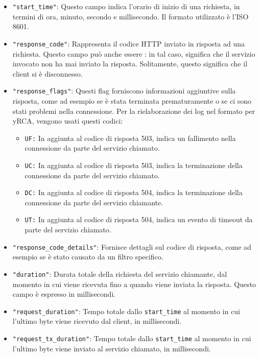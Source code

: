 \begin{itemize}
\item \texttt{"start\_time"}: Questo campo indica l'orario di inizio di una richiesta, in termini di ora, minuto, secondo e millisecondo. Il formato utilizzato è l'ISO 8601.

\item \texttt{"response\_code"}: Rappresenta il codice HTTP inviato in risposta ad una richiesta. Questo campo può anche essere : in tal caso, significa che il servizio invocato non ha mai inviato la risposta. Solitamente, questo significa che il client si è disconnesso.

\item \texttt{"response\_flags"}: Questi flag forniscono informazioni aggiuntive sulla risposta, come ad esempio se è stata terminata prematuramente o se ci sono stati problemi nella connessione. Per la rielaborazione dei log nel formato per yRCA, vengono usati questi codici:

\begin{itemize}
\item \texttt{UF:} In aggiunta al codice di risposta 503, indica un fallimento nella connessione da parte del servizio chiamato.
\item \texttt{UC:} In aggiunta al codice di risposta 503, indica la terminazione della connessione da parte del servizio chiamato.
\item \texttt{DC:} In aggiunta al codice di risposta 504, indica la terminazione della connessione da parte del servizio chiamante.
\item \texttt{UT:} In aggiunta al codice di risposta 504, indica un evento di timeout da parte del servizio chiamato.
\end{itemize}

\item \texttt{"response\_code\_details"}: Fornisce dettagli sul codice di risposta, come ad esempio se è stato causato da un filtro specifico.

\item \texttt{"duration"}: Durata totale della richiesta del servizio chiamante, dal momento in cui viene ricevuta fino a quando viene inviata la risposta. Questo campo è espresso in millisecondi.

\item \texttt{"request\_duration"}: Tempo totale dallo \texttt{start\_time} al momento in cui l’ultimo byte viene ricevuto dal client, in millisecondi.

\item \texttt{"request\_tx\_duration"}: Tempo totale dallo \texttt{start\_time} al momento in cui l’ultimo byte viene inviato al servizio chiamato, in millisecondi.


\end{itemize}
